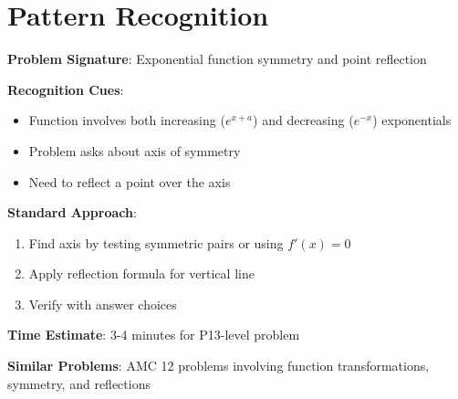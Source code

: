 \documentclass[12pt]{article}
\begin{document}
\section*{Pattern Recognition}

\textbf{Problem Signature}: Exponential function symmetry and point reflection

\textbf{Recognition Cues}:
\begin{itemize}
    \item Function involves both increasing ($e^{x+a}$) and decreasing ($e^{-x}$) exponentials
    \item Problem asks about axis of symmetry
    \item Need to reflect a point over the axis
\end{itemize}

\textbf{Standard Approach}:
\begin{enumerate}
    \item Find axis by testing symmetric pairs or using $f'(x) = 0$
    \item Apply reflection formula for vertical line
    \item Verify with answer choices
\end{enumerate}

\textbf{Time Estimate}: 3-4 minutes for P13-level problem

\textbf{Similar Problems}: AMC 12 problems involving function transformations, symmetry, and reflections
\end{document}
